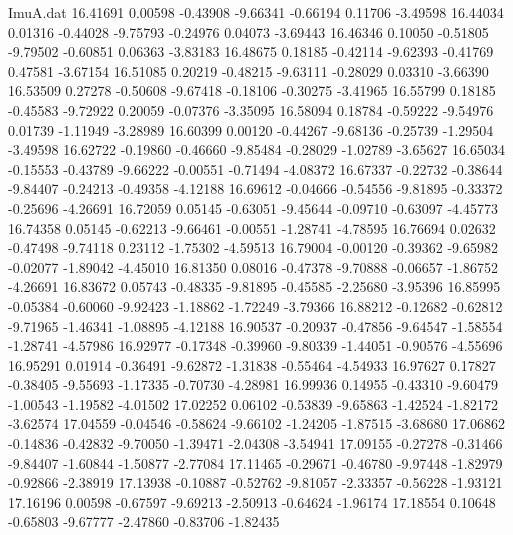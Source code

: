 \begin{filecontents}{ImuA.dat}
  16.41691    0.00598   -0.43908   -9.66341   -0.66194    0.11706   -3.49598
  16.44034    0.01316   -0.44028   -9.75793   -0.24976    0.04073   -3.69443
  16.46346    0.10050   -0.51805   -9.79502   -0.60851    0.06363   -3.83183
  16.48675    0.18185   -0.42114   -9.62393   -0.41769    0.47581   -3.67154
  16.51085    0.20219   -0.48215   -9.63111   -0.28029    0.03310   -3.66390
  16.53509    0.27278   -0.50608   -9.67418   -0.18106   -0.30275   -3.41965
  16.55799    0.18185   -0.45583   -9.72922    0.20059   -0.07376   -3.35095
  16.58094    0.18784   -0.59222   -9.54976    0.01739   -1.11949   -3.28989
  16.60399    0.00120   -0.44267   -9.68136   -0.25739   -1.29504   -3.49598
  16.62722   -0.19860   -0.46660   -9.85484   -0.28029   -1.02789   -3.65627
  16.65034   -0.15553   -0.43789   -9.66222   -0.00551   -0.71494   -4.08372
  16.67337   -0.22732   -0.38644   -9.84407   -0.24213   -0.49358   -4.12188
  16.69612   -0.04666   -0.54556   -9.81895   -0.33372   -0.25696   -4.26691
  16.72059    0.05145   -0.63051   -9.45644   -0.09710   -0.63097   -4.45773
  16.74358    0.05145   -0.62213   -9.66461   -0.00551   -1.28741   -4.78595
  16.76694    0.02632   -0.47498   -9.74118    0.23112   -1.75302   -4.59513
  16.79004   -0.00120   -0.39362   -9.65982   -0.02077   -1.89042   -4.45010
  16.81350    0.08016   -0.47378   -9.70888   -0.06657   -1.86752   -4.26691
  16.83672    0.05743   -0.48335   -9.81895   -0.45585   -2.25680   -3.95396
  16.85995   -0.05384   -0.60060   -9.92423   -1.18862   -1.72249   -3.79366
  16.88212   -0.12682   -0.62812   -9.71965   -1.46341   -1.08895   -4.12188
  16.90537   -0.20937   -0.47856   -9.64547   -1.58554   -1.28741   -4.57986
  16.92977   -0.17348   -0.39960   -9.80339   -1.44051   -0.90576   -4.55696
  16.95291    0.01914   -0.36491   -9.62872   -1.31838   -0.55464   -4.54933
  16.97627    0.17827   -0.38405   -9.55693   -1.17335   -0.70730   -4.28981
  16.99936    0.14955   -0.43310   -9.60479   -1.00543   -1.19582   -4.01502
  17.02252    0.06102   -0.53839   -9.65863   -1.42524   -1.82172   -3.62574
  17.04559   -0.04546   -0.58624   -9.66102   -1.24205   -1.87515   -3.68680
  17.06862   -0.14836   -0.42832   -9.70050   -1.39471   -2.04308   -3.54941
  17.09155   -0.27278   -0.31466   -9.84407   -1.60844   -1.50877   -2.77084
  17.11465   -0.29671   -0.46780   -9.97448   -1.82979   -0.92866   -2.38919
  17.13938   -0.10887   -0.52762   -9.81057   -2.33357   -0.56228   -1.93121
  17.16196    0.00598   -0.67597   -9.69213   -2.50913   -0.64624   -1.96174
  17.18554    0.10648   -0.65803   -9.67777   -2.47860   -0.83706   -1.82435

\end{filecontents}
